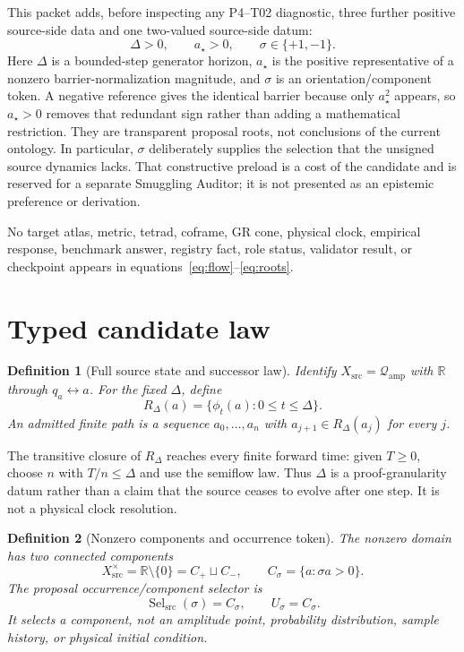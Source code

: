 \documentclass[11pt]{article}
\newtheorem{definition}{Definition}
\newcommand{\R}{\mathbb R}
\newcommand{\Qamp}{\mathcal Q_{\mathrm{amp}}}
\newcommand{\Us}{U_{\sigma}}
\begin{document}
This packet adds, before inspecting any P4--T02 diagnostic, three further
positive source-side data and one two-valued source-side datum:
\begin{equation}
   \Delta>0,\qquad a_\star>0,\qquad
   \sigma\in\{+1,-1\}.
   \label{eq:roots}
\end{equation}
Here $\Delta$ is a bounded-step generator horizon, $a_\star$ is the positive
representative of a nonzero barrier-normalization magnitude, and $\sigma$ is
an orientation/component token.  A negative reference gives the identical
barrier because only $a_\star^2$ appears, so $a_\star>0$ removes that redundant
sign rather than adding a mathematical restriction.
They are transparent proposal roots, not conclusions of the current
ontology.  In particular, $\sigma$ deliberately supplies the selection that
the unsigned source dynamics lacks.  That constructive preload is a cost of
the candidate and is reserved for a separate Smuggling Auditor; it is not
presented as an epistemic preference or derivation.

No target atlas, metric, tetrad, coframe, GR cone, physical clock, empirical
response, benchmark answer, registry fact, role status, validator result, or
checkpoint appears in equations~\eqref{eq:flow}--\eqref{eq:roots}.

\section{Typed candidate law}

\begin{definition}[Full source state and successor law]
Identify $X_{\mathrm{src}}=\Qamp$ with $\R$ through $q_a\leftrightarrow a$.
For the fixed $\Delta$, define
\begin{equation}
 R_\Delta(a)=\{\phi_t(a):0\leq t\leq\Delta\}.
 \label{eq:successors}
\end{equation}
An admitted finite path is a sequence $a_0,\ldots,a_n$ with
$a_{j+1}\in R_\Delta(a_j)$ for every $j$.
\end{definition}

The transitive closure of $R_\Delta$ reaches every finite forward time:
given $T\geq0$, choose $n$ with $T/n\leq\Delta$ and use the semiflow law.
Thus $\Delta$ is a proof-granularity datum rather than a claim that the source
ceases to evolve after one step.  It is not a physical clock resolution.

\begin{definition}[Nonzero components and occurrence token]
The nonzero domain has two connected components
\[
 X_{\mathrm{src}}^\times=\R\setminus\{0\}=C_+\sqcup C_-,
 \qquad C_\sigma=\{a:\sigma a>0\}.
\]
The proposal occurrence/component selector is
\begin{equation}
  \operatorname{Sel}_{\mathrm{src}}(\sigma)=C_\sigma,
  \qquad \Us=C_\sigma.
  \label{eq:selector}
\end{equation}
It selects a component, not an amplitude point, probability distribution,
sample history, or physical initial condition.
\end{definition}
\end{document}
